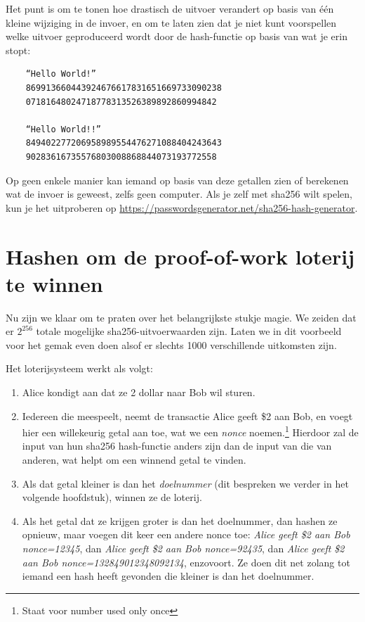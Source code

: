 \documentclass[
  letterpaper,
]{scrbook}
\begin{document}
Het punt is om te tonen hoe drastisch de uitvoer verandert op basis van
één kleine wijziging in de invoer, en om te laten zien dat je niet kunt
voorspellen welke uitvoer geproduceerd wordt door de hash-functie op
basis van wat je erin stopt:

\begin{verbatim}
    “Hello World!”
    869913660443924676617831651669733090238
    07181648024718778313526389892860994842
   
    “Hello World!!”
    849402277206958989554476271088404243643
    90283616735576803008868844073193772558
\end{verbatim}

Op geen enkele manier kan iemand op basis van deze getallen zien of
berekenen wat de invoer is geweest, zelfs geen computer. Als je zelf met
sha256 wilt spelen, kun je het uitproberen op
\url{https://passwordsgenerator.net/sha256-hash-generator}.

\hypertarget{hashen-om-de-proof-of-work-loterij-te-winnen}{%
\section{Hashen om de proof-of-work loterij te
winnen}\label{hashen-om-de-proof-of-work-loterij-te-winnen}}

Nu zijn we klaar om te praten over het belangrijkste stukje magie. We
zeiden dat er \(2^{256}\) totale mogelijke sha256-uitvoerwaarden zijn.
Laten we in dit voorbeeld voor het gemak even doen alsof er slechts 1000
verschillende uitkomsten zijn.

Het loterijsysteem werkt als volgt:

\begin{enumerate}
\def\labelenumi{\arabic{enumi}.}
\item
  Alice kondigt aan dat ze 2 dollar naar Bob wil sturen.
\item
  Iedereen die meespeelt, neemt de transactie Alice geeft \$2 aan Bob,
  en voegt hier een willekeurig getal aan toe, wat we een \emph{nonce}
  noemen.\footnote{Staat voor number used only once} Hierdoor zal de
  input van hun sha256 hash-functie anders zijn dan de input van die van
  anderen, wat helpt om een winnend getal te vinden.
\item
  Als dat getal kleiner is dan het \emph{doelnummer} (dit bespreken we
  verder in het volgende hoofdstuk), winnen ze de loterij.
\item
  Als het getal dat ze krijgen groter is dan het doelnummer, dan hashen
  ze opnieuw, maar voegen dit keer een andere nonce toe: \emph{Alice
  geeft \$2 aan Bob nonce=12345}, dan \emph{Alice geeft \$2 aan Bob
  nonce=92435}, dan \emph{Alice geeft \$2 aan Bob
  nonce=132849012348092134}, enzovoort. Ze doen dit net zolang tot
  iemand een hash heeft gevonden die kleiner is dan het doelnummer.
\end{enumerate}
\end{document}
